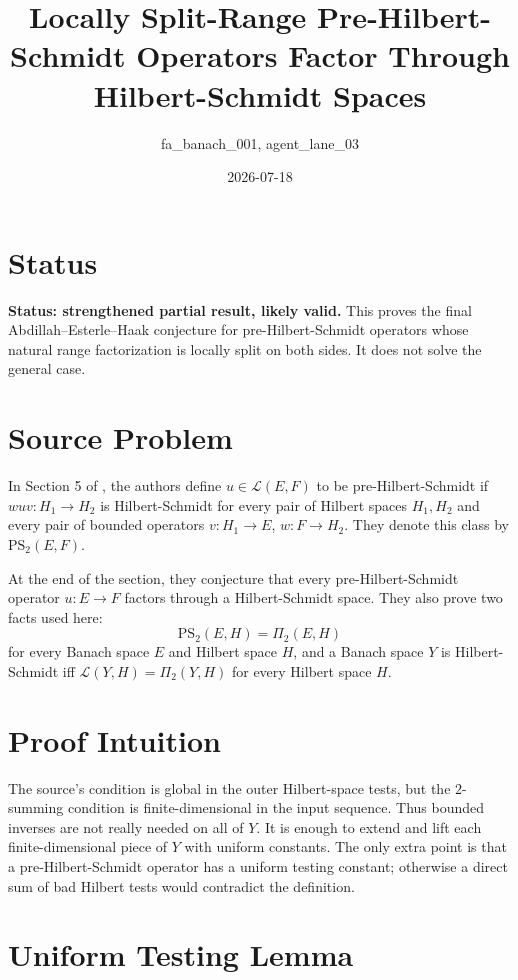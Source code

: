 \documentclass[11pt]{amsart}
\title[Locally Split PHS Factorization]{Locally Split-Range Pre-Hilbert-Schmidt Operators Factor Through Hilbert-Schmidt Spaces}
\author{fa\_banach\_001, agent\_lane\_03}
\date{2026-07-18}
\newcommand{\PHS}{\mathrm{PS}_2}
\newcommand{\PiTwo}{\Pi_2}
\newcommand{\calL}{\mathcal L}
\begin{document}
\maketitle

\section*{Status}

\textbf{Status: strengthened partial result, likely valid.}
This proves the final Abdillah--Esterle--Haak conjecture \cite{AEH}
for pre-Hilbert-Schmidt operators whose natural range factorization is
locally split on both sides. It does not solve the general case.

\section*{Source Problem}

In Section 5 of \cite{AEH}, the authors define $u\in\calL(E,F)$ to be
pre-Hilbert-Schmidt if $wuv:H_1\to H_2$ is Hilbert-Schmidt for every
pair of Hilbert spaces $H_1,H_2$ and every pair of bounded operators
$v:H_1\to E$, $w:F\to H_2$. They denote this class by $\PHS(E,F)$.

At the end of the section, they conjecture that every
pre-Hilbert-Schmidt operator $u:E\to F$ factors through a
Hilbert-Schmidt space. They also prove two facts used here:
\[
  \PHS(E,H)=\PiTwo(E,H)
\]
for every Banach space $E$ and Hilbert space $H$, and a Banach space
$Y$ is Hilbert-Schmidt iff $\calL(Y,H)=\PiTwo(Y,H)$ for every Hilbert
space $H$.

\section*{Proof Intuition}

The source's condition is global in the outer Hilbert-space tests, but
the $2$-summing condition is finite-dimensional in the input sequence.
Thus bounded inverses are not really needed on all of $Y$. It is enough
to extend and lift each finite-dimensional piece of $Y$ with uniform
constants. The only extra point is that a pre-Hilbert-Schmidt operator
has a uniform testing constant; otherwise a direct sum of bad Hilbert
tests would contradict the definition.

\section*{Uniform Testing Lemma}
\end{document}

